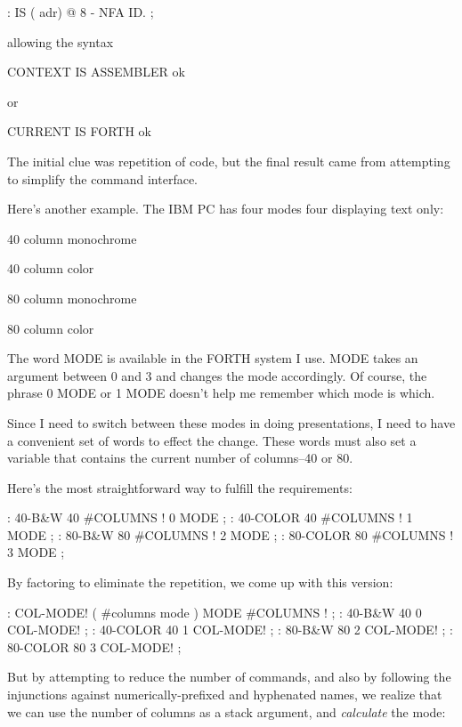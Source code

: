 \begin{Code}
: IS  ( adr)   @  8 -  NFA  ID. ;
\end{Code}
allowing the syntax

\begin{Code}
CONTEXT IS ASSEMBLER ok
\end{Code}
or

\begin{Code}
CURRENT IS FORTH ok
\end{Code}
The initial clue was repetition of code, but the final result came from attempting to simplify the command interface.

Here's another example. The IBM PC has four modes four displaying text only:

\bigskip

40 column monochrome

40 column color

80 column monochrome

80 column color

\bigskip

\noindent
The word MODE is available in the FORTH system I use. MODE takes an argument between 0 and 3 and changes the mode accordingly. Of course, the phrase 0 MODE or 1 MODE doesn't help me remember which mode is which.

Since I need to switch between these modes in doing presentations, I need to have a convenient set of words to effect the change. These words must also set a variable that contains the current number of columns--40 or 80.

Here's the most straightforward way to fulfill the requirements:

\begin{Code}
: 40-B&W       40 #COLUMNS !  0 MODE ;
: 40-COLOR     40 #COLUMNS !  1 MODE ;
: 80-B&W       80 #COLUMNS !  2 MODE ;
: 80-COLOR     80 #COLUMNS !  3 MODE ;
\end{Code}
By factoring to eliminate the repetition, we come up with this version:

\begin{Code}
: COL-MODE!     ( #columns mode )  MODE  #COLUMNS ! ;
: 40-B&W       40 0 COL-MODE! ;
: 40-COLOR     40 1 COL-MODE! ;
: 80-B&W       80 2 COL-MODE! ;
: 80-COLOR     80 3 COL-MODE! ;
\end{Code}
But by attempting to reduce the number of commands, and also by following the injunctions against numerically-prefixed and hyphenated names, we realize that we can use the number of columns as a stack argument, and \emph{calculate} the mode:


